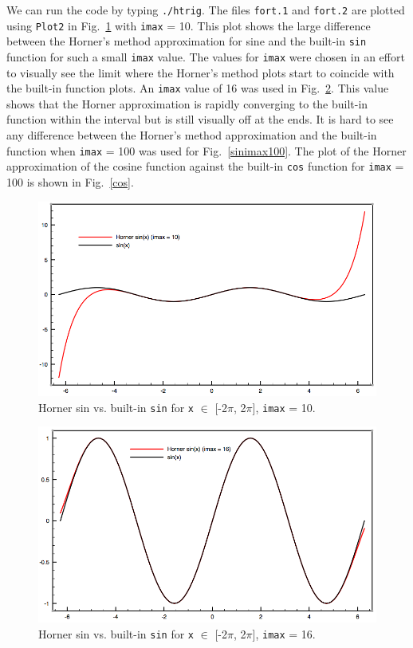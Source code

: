 \documentclass[12pt]{article}
\begin{document}
We can run the code by typing {\tt ./htrig}. The files {\tt fort.1} and {\tt fort.2} are plotted using {\tt Plot2} in Fig.\ \ref{sinimax10} with {\tt imax} = 10. This plot shows the large difference between the Horner's method approximation for sine and the built-in {\tt sin} function for such a small {\tt imax} value. The values for {\tt imax} were chosen in an effort to visually see the limit where the Horner's method plots start to coincide with the built-in function plots.  An {\tt imax} value of 16 was used in Fig.\ \ref{sinimax16}.  This value shows that the Horner approximation is rapidly converging to the built-in function within the interval but is still visually off at the ends.  It is hard to see any difference between the Horner's method approximation and the built-in function when {\tt imax} = 100 was used for Fig.\ \ref{sinimax100}.  The plot of the Horner approximation of the cosine function against the built-in {\tt cos} function for {\tt imax} = 100 is shown in Fig.\ \ref{cos}.

\begin{figure}[htb!]
\includegraphics[width=1.\textwidth]{fig/sinimax10.png}
\caption{Horner sin vs. built-in {\tt sin} for {\tt x} $\in$ [-2$\pi$, 2$\pi$], {\tt imax} = 10.}
\label{sinimax10}
\end{figure}

\begin{figure}[htb!]
\includegraphics[width=1.\textwidth]{fig/sinimax16.png}
\caption{Horner sin vs. built-in {\tt sin} for {\tt x} $\in$ [-2$\pi$, 2$\pi$], {\tt imax} = 16.}
\label{sinimax16}
\end{figure}
\end{document}
